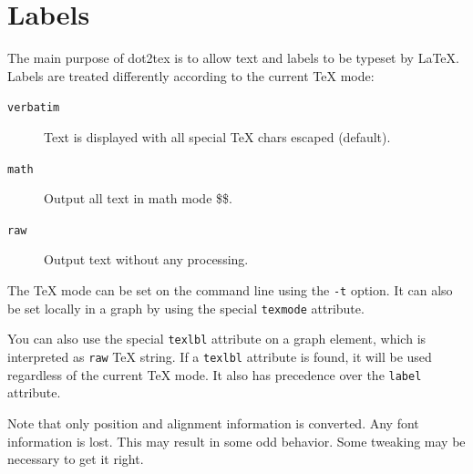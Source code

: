 \documentclass[10pt,a4paper,english]{article}
\newlength{\admonitionwidth}
\begin{document}

\hypertarget{labels}{}
\section*{Labels}
\label{labels}

The main purpose of dot2tex is to allow text and labels to be typeset by LaTeX. Labels are  treated differently according to the current TeX mode:
\begin{description}
\item[{\texttt{verbatim}}] \leavevmode 
Text is displayed with all special TeX chars escaped (default).

\item[{\texttt{math}}] \leavevmode 
Output all text in math mode {\$}{\$}.

\item[{\texttt{raw}}] \leavevmode 
Output text without any processing.

\end{description}

The TeX mode can be set on the command line using the \texttt{-t} option. It can also be set locally in a graph by using the special \texttt{texmode} attribute.

You can also use the special \texttt{texlbl} attribute on a graph element, which is interpreted as \texttt{raw} TeX string. If a \texttt{texlbl} attribute is found, it will be used regardless of the current TeX mode. It also has precedence over the \texttt{label} attribute.
\begin{center}\begin{sffamily}
\end{sffamily}
\end{center}

Note that only position and alignment information is converted. Any font information is lost. This may result in some odd behavior. Some tweaking may be necessary to get it right.
\begin{center}\begin{sffamily}
\end{sffamily}
\end{center}
\end{document}
